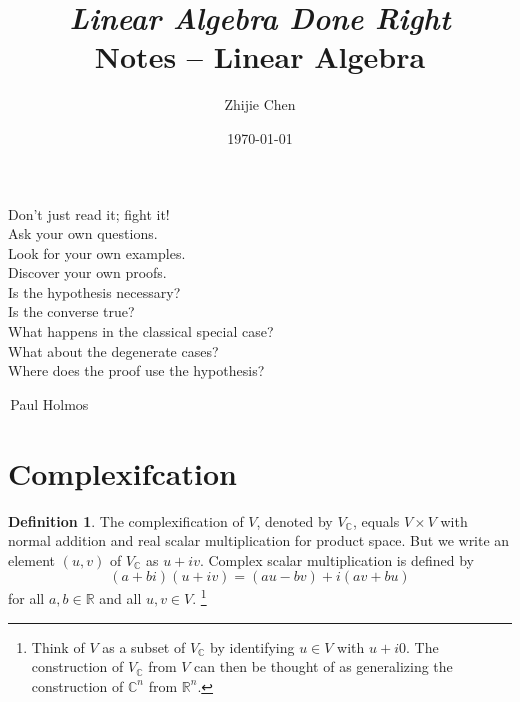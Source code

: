 \documentclass{tufte-handout}
\title{	
	\normalfont\normalsize 
	{\itshape Linear Algebra Done Right} \\ [0pt]
	\huge Notes -- Linear Algebra
}
\author{Zhijie Chen}
\date{\vspace{-5pt}\normalsize\today}
\theoremstyle{plain} %
\theoremstyle{definition}
\newtheorem{defn}[thm]{Definition}
\newtheorem{notns}[thm]{Notations}
\theoremstyle{remark}
\newcommand{\R}{\mathbb{R}}
\newcommand{\C}{\mathbb{C}}
\newcommand{\F}{\mathbb{F}}
\begin{document}
\justifying
\maketitle
\tableofcontents
\newpage

\thispagestyle{empty}
\begin{fullwidth}
	\Large
	\vspace*{\fill}
	\begin{center}
		Don't just read it; fight it!\\
		Ask your own questions.\\
		Look for your own examples.\\
		Discover your own proofs.\\
		Is the hypothesis necessary?\\
		Is the converse true?\\
		What happens in the classical special case?\\
		What about the degenerate cases?\\
		Where does the proof use the hypothesis?
	\end{center}
	\begin{flushright}
		\textemdash\,Paul Holmos\phantom{placeholderrrrrr}
	\end{flushright}
	\vspace*{\fill}
\end{fullwidth}
\newpage





\section{Complexifcation}
\begin{defn}
	The complexification of $V$, denoted by $V_\C$, equals $V\times V$ with normal addition and real scalar multiplication for product space. But we write an element $(u,v)$ of $V_\C$ as $u+iv$. Complex scalar multiplication is defined by
	\[(a+bi)(u+iv)=(au-bv)+i(av+bu)\]
	for all $a,b\in\R$ and all $u,v\in V$.%
	\footnote{Think of $V$ as a subset of $V_\C$ by identifying $u\in V$ with $u+i0$. The construction of $V_\C$ from $V$ can then be thought of as generalizing the construction of $\C^n$ from $\R^n$.}
\end{defn}
\end{document}
